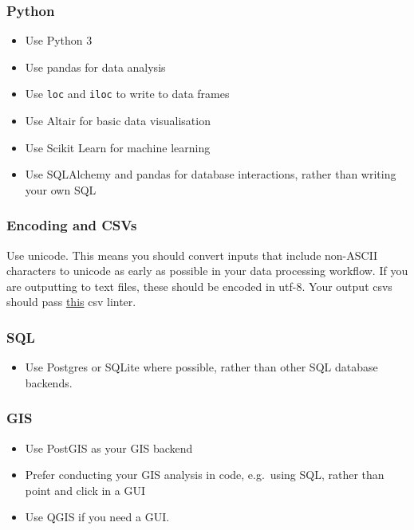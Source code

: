 \documentclass[]{book}
\providecommand{\tightlist}{%
  \setlength{\itemsep}{0pt}\setlength{\parskip}{0pt}}
\begin{document}
\hypertarget{python-1}{%
\subsubsection*{Python}\label{python-1}}

\begin{itemize}
\tightlist
\item
  Use Python 3
\item
  Use pandas for data analysis
\item
  Use \texttt{loc} and \texttt{iloc} to write to data frames
\item
  Use Altair for basic data visualisation
\item
  Use Scikit Learn for machine learning
\item
  Use SQLAlchemy and pandas for database interactions, rather than writing your own SQL
\end{itemize}

\hypertarget{encoding-and-csvs}{%
\subsubsection*{Encoding and CSVs}\label{encoding-and-csvs}}

Use unicode. This means you should convert inputs that include non-ASCII characters to unicode as early as possible in your data processing workflow. If you are outputting to text files, these should be encoded in utf-8. Your output csvs should pass \href{https://csvlint.io/}{this} csv linter.

\hypertarget{sql}{%
\subsubsection*{SQL}\label{sql}}

\begin{itemize}
\tightlist
\item
  Use Postgres or SQLite where possible, rather than other SQL database backends.
\end{itemize}

\hypertarget{gis}{%
\subsubsection*{GIS}\label{gis}}

\begin{itemize}
\tightlist
\item
  Use PostGIS as your GIS backend
\item
  Prefer conducting your GIS analysis in code, e.g.~using SQL, rather than point and click in a GUI
\item
  Use QGIS if you need a GUI.
\end{itemize}
\end{document}
